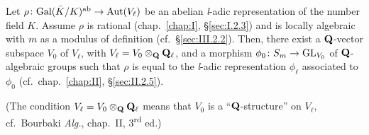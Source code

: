 \begin{theorem}[2]\label{thm:III.2.3.2}
Let $\rho\colon\mathrm{Gal}(\bar K/K)^{\mathrm{ab}}\to\mathrm{Aut}(V_\ell)$ be an abelian
\textit{l}-adic representation of the number field $K$.  Assume $\rho$ is
rational (chap.~\ref{chap:I}, \S\ref{sec:I.2.3}) and is locally algebraic
with $m$ as a modulus of definition (cf.~\S\ref{sec:III.2.2}).  Then,
there exist a $\mathbf{Q}$-vector subspace $V_0$ of $V_\ell$, with
$V_\ell = V_0\mathbin{\otimes}_{\mathbf{Q}}\mathbf{Q}_\ell$, and a morphism
$\phi_0\colon S_m\to\mathrm{GL}_{V_0}$ of $\mathbf{Q}$-algebraic groups such that $\rho$
is equal to the \textit{l}-adic representation $\phi_\ell$ associated to
$\phi_0$ (cf.~chap.~\ref{chap:II}, \S\ref{sec:II.2.5}).
\end{theorem}

(The condition $V_\ell = V_0\mathbin{\otimes}_{\mathbf{Q}}\mathbf{Q}_\ell$ means that $V_0$ is a
``$\mathbf{Q}$-structure'' on $V_\ell$, cf.~Bourbaki \emph{Alg.}, chap.~II,
3\textsuperscript{rd} ed.)

